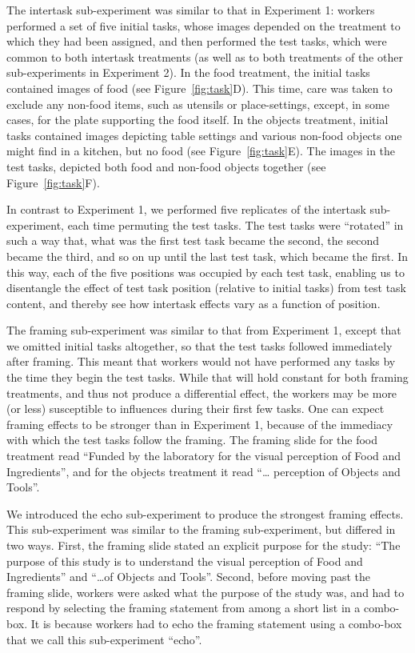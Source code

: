 \documentclass{sigchi}
\begin{document}
The intertask sub-experiment was similar to that in Experiment 1: workers
performed a set of five initial tasks, whose images depended on the 
treatment to which they had been assigned, and then performed the test 
tasks, which were common to both intertask treatments (as well as to both 
treatments of the other sub-experiments in Experiment 2).  
In the food treatment, 
the initial tasks contained images of food (see Figure~\ref{fig:task}D).  
This time, care was taken to exclude any non-food items, 
such as utensils or place-settings, except, in some cases, for the plate
supporting the food itself.  In the objects treatment, initial tasks 
contained images depicting table settings and various non-food objects one 
might find in a kitchen, but no food (see Figure~\ref{fig:task}E).  
The images in the test tasks,
depicted both food and non-food objects together 
(see Figure~\ref{fig:task}F).

In contrast to Experiment 1, we performed five replicates of the intertask
sub-experiment, each time permuting the test tasks.  The test tasks were
``rotated'' in such a way that, what was the first test task became
the second, the second became the third, and so on up until the last test
task, which became the first.  In this way, each of the five positions
was occupied by each test task, enabling us to disentangle the effect of
test task position (relative to initial tasks) from test task content,
and thereby see how intertask effects vary as a function of position.

The framing sub-experiment was similar to that from Experiment 1, except
that we omitted initial tasks altogether, so that the test tasks followed
immediately after framing.  This meant that workers would not have 
performed any tasks by the time they begin the test tasks.  While that will
hold constant for both framing treatments, and thus not produce a 
differential effect, the workers may be more (or less) susceptible to 
influences during their first few tasks.  One can expect framing effects
to be stronger than in Experiment 1, because of the immediacy with which
the test tasks follow the framing.  The framing slide for the food 
treatment read ``Funded by the laboratory for the visual perception of 
Food and Ingredients'', and for the objects treatment it read ``\ldots
perception of Objects and Tools''.

We introduced the echo sub-experiment to produce the strongest framing 
effects.  This sub-experiment was similar to the framing sub-experiment,
but differed in two ways.  First, the framing slide stated an explicit
purpose for the study: ``The purpose of this study is to understand the 
visual perception of Food and Ingredients'' 
and ``\ldots of Objects and Tools''.  Second, before moving past the
framing slide, workers were asked what the purpose of the study was, and
had to respond by selecting the framing statement from among a short
list in a combo-box.  It is because workers had to echo the framing 
statement using a combo-box that we call this sub-experiment ``echo''.
\end{document}
